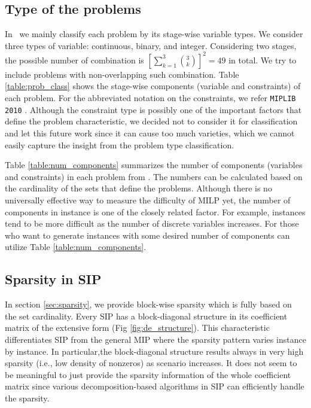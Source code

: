 \subsection{Type of the problems}
In \siplibtwo\, we mainly classify each problem by its stage-wise variable types. We consider three types of variable: continuous, binary, and integer. Considering two stages, the possible number of combination is $\left[\sum_{k=1}^3\binom{3}{k}\right]^2=49$ in total. We try to include problems with non-overlapping such combination. Table \ref{table:prob_class} shows the stage-wise components (variable and constraints) of each problem. For the abbreviated notation on the constraints, we refer \texttt{MIPLIB 2010} \cite{MIPLIB}. Although the constraint type is possibly one of the important factors that define the problem characteristic, we decided not to consider it for classification and let this future work since it can cause too much varieties, which we cannot easily capture the insight from the problem type classification. 


Table \ref{table:num_components} summarizes the number of components (variables and constraints) in each problem from \siplibtwo. The numbers can be calculated based on the cardinality of the sets that define the problems. Although there is no universally effective way to measure the difficulty of MILP yet, the number of components in instance is one of the closely related factor. For example, instances tend to be more difficult as the number of discrete variables increases. For those who want to generate instances with some desired number of components can utilize Table \ref{table:num_components}.



\subsection{Sparsity in SIP}
In section \ref{sec:sparsity}, we provide block-wise sparsity which is fully based on the set cardinality. Every SIP has a block-diagonal structure in its coefficient matrix of the extensive form (Fig \ref{fig:de_structure}). This characteristic differentiates SIP from the general MIP where the sparsity pattern varies instance by instance. In particular,the block-diagonal structure results always in very high sparsity (i.e., low density of nonzeros) as scenario increases. It does not seem to be meaningful to just provide the sparsity information of the whole coefficient matrix since various decomposition-based algorithms in SIP can efficiently handle the sparsity. 

